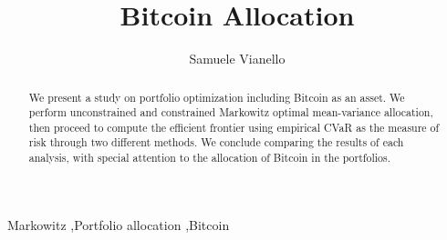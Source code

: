 \documentclass[12pt]{elsarticle}
\begin{document}
\begin{frontmatter}


\title{Bitcoin Allocation}




\author{Samuele Vianello}


\begin{abstract}
We present a study on portfolio optimization including Bitcoin as an asset. We perform unconstrained and constrained Markowitz optimal mean-variance allocation, then proceed to compute the efficient frontier using empirical CVaR as the measure of risk through two different methods. We conclude comparing the results of each analysis, with special attention to the allocation of Bitcoin in the portfolios.
\end{abstract}

\begin{keyword}
Markowitz \sep Portfolio allocation \sep Bitcoin


\end{keyword}

\end{frontmatter}


\end{document}
